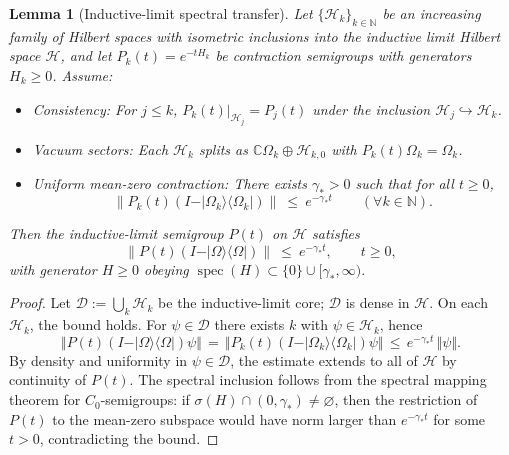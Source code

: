\documentclass[11pt]{amsart}
\theoremstyle{plain}
\newtheorem{lemma}[theorem]{Lemma}
\theoremstyle{definition}
\theoremstyle{remark}
\begin{document}
\begin{lemma}[Inductive-limit spectral transfer]\label{lem:inductive-spectral}
Let $\{\mathcal H_k\}_{k\in\mathbb N}$ be an increasing family of Hilbert spaces with isometric inclusions into the inductive limit Hilbert space $\mathcal H$, and let $P_k(t)=e^{-tH_k}$ be contraction semigroups with generators $H_k\ge 0$. Assume:
\begin{itemize}
  \item Consistency: For $j\le k$, $P_k(t)|_{\mathcal H_j}=P_j(t)$ under the inclusion $\mathcal H_j\hookrightarrow\mathcal H_k$.
  \item Vacuum sectors: Each $\mathcal H_k$ splits as $\mathbb C\Omega_k\oplus \mathcal H_{k,0}$ with $P_k(t)\Omega_k=\Omega_k$.
  \item Uniform mean-zero contraction: There exists $\gamma_*>0$ such that for all $t\ge 0$,
  \[
    \big\|P_k(t)(I-\vert\Omega_k\rangle\langle\Omega_k\vert)\big\|\ \le\ e^{-\gamma_* t}\qquad(\forall k\in\mathbb N).
  \]
\end{itemize}
Then the inductive-limit semigroup $P(t)$ on $\mathcal H$ satisfies
\[
  \big\|P(t)(I-\vert\Omega\rangle\langle\Omega\vert)\big\|\ \le\ e^{-\gamma_* t},\qquad t\ge 0,
\]
with generator $H\ge 0$ obeying $\operatorname{spec}(H)\subset\{0\}\cup[\gamma_*,\infty)$.
\end{lemma}
\begin{proof}
Let $\mathcal D:=\bigcup_k \mathcal H_k$ be the inductive-limit core; $\mathcal D$ is dense in $\mathcal H$. On each $\mathcal H_k$, the bound holds. For $\psi\in \mathcal D$ there exists $k$ with $\psi\in\mathcal H_k$, hence
\[
  \Vert P(t)(I-\vert\Omega\rangle\langle\Omega\vert)\psi\Vert
  \,=\,\Vert P_k(t)(I-\vert\Omega_k\rangle\langle\Omega_k\vert)\psi\Vert
  \,\le\, e^{-\gamma_* t}\,\Vert\psi\Vert.
\]
By density and uniformity in $\psi\in\mathcal D$, the estimate extends to all of $\mathcal H$ by continuity of $P(t)$. The spectral inclusion follows from the spectral mapping theorem for $C_0$-semigroups: if $\sigma(H)\cap(0,\gamma_*)\ne\varnothing$, then the restriction of $P(t)$ to the mean-zero subspace would have norm larger than $e^{-\gamma_* t}$ for some $t>0$, contradicting the bound.
\end{proof}
\end{document}
